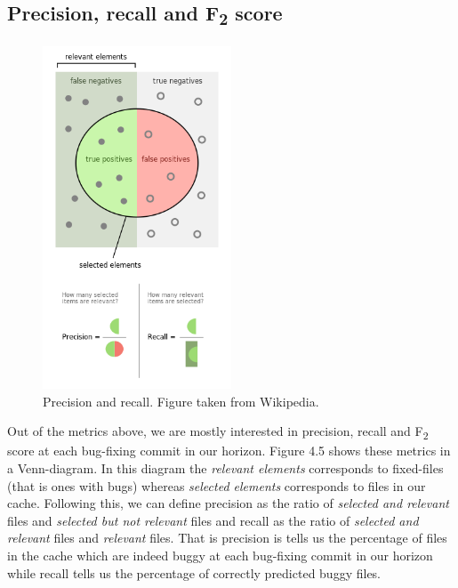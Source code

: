 \documentclass[12pt,twoside,notitlepage]{report}
\begin{document}
\subsection{Precision, recall and F\textsubscript{2} score}
\begin{figure}[h]
\includegraphics[width=0.5\textwidth]{Precisionrecall.png}
\centering
 \begin{minipage}{\linewidth}
    \caption[Precision and recall.]%
    {Precision and recall. Figure taken from Wikipedia\footnotemark.}
    
  \end{minipage}

\end{figure}
Out of the metrics above, we are mostly interested in precision, recall and F\textsubscript{2} score at each bug-fixing commit in our horizon. Figure 4.5 shows these metrics in a Venn-diagram. In this diagram the \textit{relevant elements} corresponds to fixed-files (that is ones with bugs) whereas \textit{selected elements} corresponds to files in our cache. Following this, we can define precision as the ratio of \textit{selected and relevant} files and \textit{selected but not relevant} files and recall as the ratio of \textit{selected and relevant} files and \textit{relevant} files. That is precision is tells us the percentage of files in the cache which are indeed buggy at each bug-fixing commit in our horizon while recall tells us the percentage of correctly predicted buggy files. 
\end{document}
